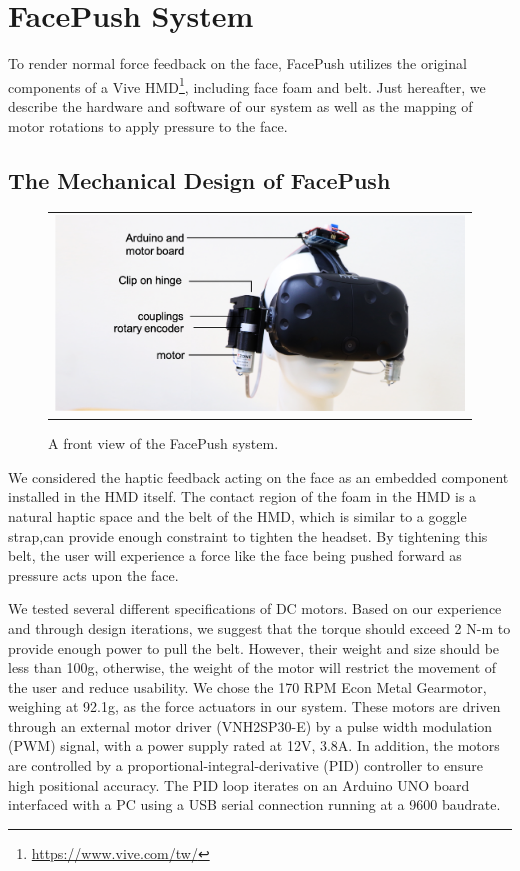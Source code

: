 \chapter{FacePush System} \label{chapter:system}
To render normal force feedback on the face, FacePush utilizes the original components of a Vive HMD\footnote{\url{https://www.vive.com/tw/}}, including face foam and belt. Just hereafter, we describe the hardware and software of our system as well as the mapping of motor rotations to apply pressure to the face.

\section{The Mechanical Design of FacePush }

\begin{figure}[h]
\begin{center}
    \begin{tabular}{@{\hspace{0.1cm}}c}
    \includegraphics[width=1\textwidth]{figures/FrontView.png}
    \end{tabular}
    \caption{A front view of the FacePush system.}
    \label{fig:FrontView}
    \end{center}
\end{figure}

We considered the haptic feedback acting on the face as an embedded component installed in the HMD itself. The contact region of the foam in the HMD is a natural haptic space and the belt of the HMD, which is similar to a goggle strap,can provide  enough  constraint  to  tighten  the  headset. By tightening this belt, the user will experience a force like the face being pushed forward as pressure acts upon the face.

We tested several different specifications of DC motors. Based on our experience and through design iterations, we suggest that the torque should exceed 2 N-m to provide enough power to pull the belt. However, their weight and size should be less than 100g, otherwise, the weight of the motor will restrict the movement of the user and reduce usability. We chose the 170 RPM Econ Metal Gearmotor, weighing at 92.1g, as the force actuators in our system. These motors are driven through an external motor driver (VNH2SP30-E) by a pulse width modulation (PWM) signal, with a power supply rated at 12V, 3.8A. In addition, the motors are controlled by a proportional-integral-derivative (PID) controller to ensure high positional accuracy. The PID loop iterates on an Arduino UNO board interfaced with a PC using a USB serial connection running at a 9600 baudrate.

